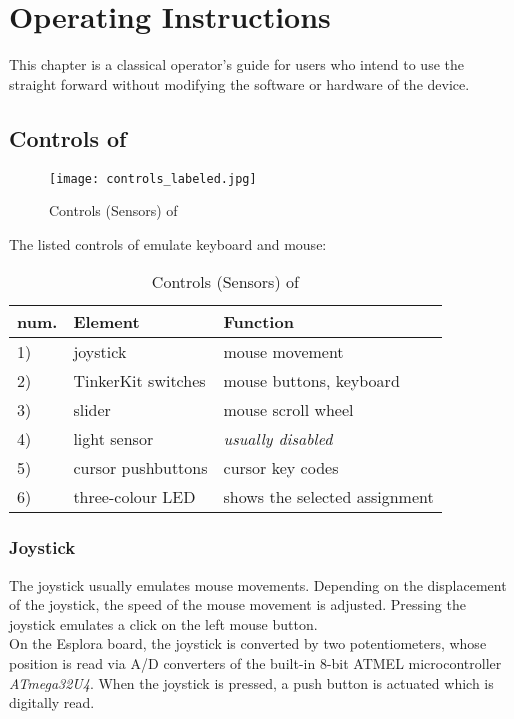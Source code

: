\chapter{Operating Instructions}
\label{cha:manual}
This chapter is a classical operator's guide for users who intend to use
the {\Bezeichnung} straight forward without modifying the software or
hardware of the device.

\section{Controls of {\Bezeichnung}}
\begin{figure}[h]
\centering
\texttt{[image: controls\_labeled.jpg]}
\caption{Controls (Sensors) of {\Bezeichnung}}
\label{fig:controls}
\end{figure}

The listed controls of {\Bezeichnung} emulate keyboard and mouse:

\begin{table}[h]
\centering
\renewcommand{\arraystretch}{1.5}
\begin{tabular}{|p{}|p{}|p{}|}
\hline
\textbf{num.}		&	\textbf{Element}	&	\textbf{Function}\\
\hline
		1)			&	joystick			&	mouse movement\\
\hline
		2)			&	TinkerKit switches	&	mouse buttons, keyboard\\
\hline
		3)			&	slider				&	mouse scroll wheel\\
\hline
		4)			&	light sensor		&	\textit{usually disabled}\\
\hline
		5)			&	cursor pushbuttons	&	cursor key codes\\
\hline
		6)			&	three-colour LED	&	shows the selected assignment\\
\hline
\end{tabular}
\vspace{0.5cm}
\caption{Controls (Sensors) of {\Bezeichnung}}
\end{table}

\subsection*{Joystick}
The joystick usually emulates mouse movements. Depending on the
displacement of the joystick, the speed of the mouse movement is
adjusted. Pressing the joystick emulates a click on the left mouse
button.\\
On the Esplora board, the joystick is converted by two potentiometers,
whose position is read via A/D converters of the built-in 8-bit ATMEL
microcontroller \textit{ATmega32U4}. When the joystick is pressed, a
push button is actuated which is digitally read.

